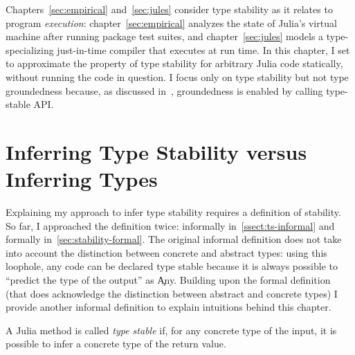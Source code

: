 Chapters~\ref{sec:empirical} and~\ref{sec:jules} consider type stability as it
relates to program \emph{execution}: chapter~\ref{sec:empirical} analyzes the
state of Julia's virtual machine after running package test suites, and chapter~\ref{sec:jules} models a
type-specializing just-in-time compiler that executes at run time.
In this chapter, I set to approximate the property of type stability for
arbitrary Julia code statically, without running the code in question.
I focus only on type stability but not type groundedness because,
as discussed in~, groundedness is enabled by calling
type-stable API.

\section{Inferring Type Stability versus Inferring Types}

Explaining my approach to infer type stability requires a definition of stability.
So far, I approached the definition twice: informally
in~\ref{ssect:ts-informal} and formally in~\ref{sec:stability-formal}.
The original informal
definition does not take into account the distinction between concrete and
abstract types: using this loophole, any code can be declared type stable
because it is always possible to ``predict the type of the output'' as \c{Any}.
Building upon the formal definition (that does acknowledge the distinction
between abstract and concrete types)
I provide another informal definition to explain intuitions behind this
chapter.
\begin{definition}
  A Julia method is called \emph{type stable} if, for any concrete type of the
  input, it is possible to infer a concrete type of the return value.
\end{definition}

